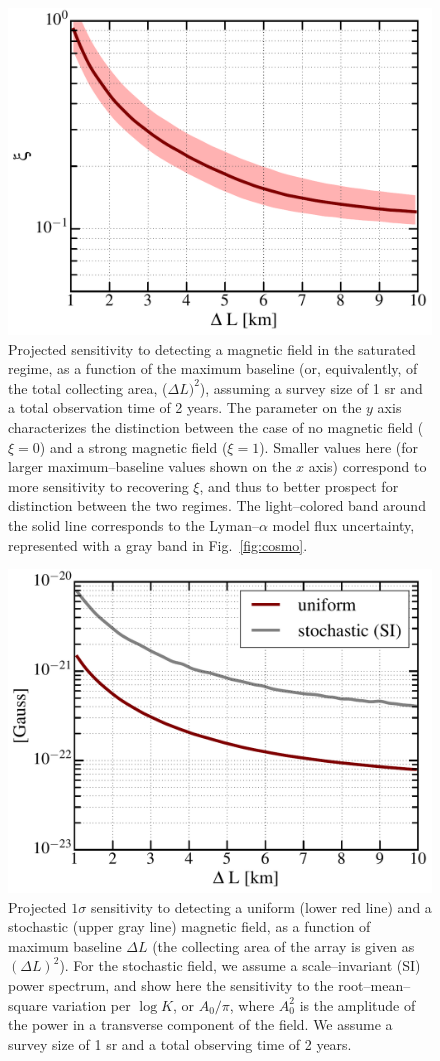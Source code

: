 \begin{figure}
\centering
\includegraphics[width=.35\textwidth,keepaspectratio=true]{xi_vs_deltas.pdf}
\caption{Projected sensitivity to detecting a magnetic field in the saturated regime, as a function of the maximum baseline (or, equivalently, of the total collecting area, ($\Delta L)^2$), assuming a survey size of 1 sr and a total observation time of 2 years. The parameter on the $y$ axis characterizes the distinction between the case of no magnetic field ($\xi=0$) and a strong magnetic field ($\xi=1$). Smaller values here (for larger maximum--baseline values shown on the $x$ axis) correspond to more sensitivity to recovering $\xi$, and thus to better prospect for distinction between the two regimes. The light--colored band around the solid line corresponds to the Lyman--$\alpha$ model flux uncertainty, represented with a gray band in Fig.~\ref{fig:cosmo}.\label{fig:xi_vs_deltas}}
\end{figure}
\begin{figure}
\centering
\includegraphics[width=.35\textwidth,keepaspectratio=true]{B_vs_deltas.pdf}
\caption{Projected $1\sigma$ sensitivity to detecting a uniform (lower red line) and a stochastic (upper gray line) magnetic field, as a function of maximum baseline $\Delta L$ (the collecting area of the array is given as $(\Delta L)^2$).  For the stochastic field, we assume a scale--invariant (SI) power spectrum, and show here the sensitivity to the root--mean--square variation per $\log K$, or $A_0/\pi$, where $A_0^2$ is the amplitude of the power in a transverse component of the field. We assume a survey size of 1 sr and a total observing time of 2 years.\label{fig:B_vs_deltas}}
\end{figure}
